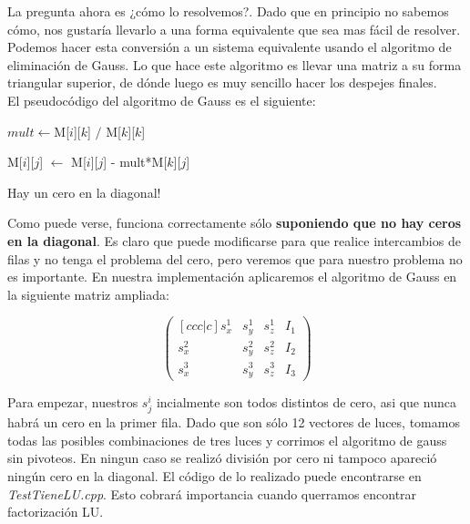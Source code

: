 La pregunta ahora es ¿cómo lo resolvemos?. Dado que en principio no sabemos cómo, nos gustaría llevarlo a una forma equivalente que sea mas fácil de resolver. Podemos hacer esta conversión a un sistema equivalente usando el algoritmo de eliminación de Gauss. Lo que hace este algoritmo es llevar una matriz a su forma triangular superior, de dónde luego es muy sencillo hacer los despejes finales. \\

El pseudocódigo del algoritmo de Gauss es el siguiente:

\begin{algorithm}[H]
\begin{algorithmic}


                \State $mult \gets $M[$i$][$k$] $/$ M[$k$][$k$]

                    \State M[$i$][$j$] $\gets$ M[$i$][$j$] - mult*M[$k$][$j$]

                \EndFor
            \Else
                \State Hay un cero en la diagonal!
            \EndIf
        \EndFor
    \EndFor

\EndFunction
\end{algorithmic}
\end{algorithm}

Como puede verse, funciona correctamente sólo \textbf{suponiendo que no hay ceros en la diagonal}. Es claro que puede modificarse para que realice intercambios de filas y no tenga el problema del cero, pero veremos que para nuestro problema no es importante. En nuestra implementación aplicaremos el algoritmo de Gauss en la siguiente matriz ampliada:

\[
\begin{pmatrix}[ccc|c]
    s_{x}^{1} & s_{y}^{1} & s_{z}^{1} & I_{1} \\
    s_{x}^{2} & s_{y}^{2} & s_{z}^{2} & I_{2} \\
    s_{x}^{3} & s_{y}^{3} & s_{z}^{3} & I_{3}
\end{pmatrix}
\]

Para empezar, nuestros $s_{j}^{i}$ incialmente son todos distintos de cero, asi que nunca habrá un cero en la primer fila. Dado que son sólo 12 vectores de luces, tomamos todas las posibles combinaciones de tres luces y corrimos el algoritmo de gauss sin pivoteos. En ningun caso se realizó división por cero ni tampoco apareció ningún cero en la diagonal. El código de lo realizado puede encontrarse en \textit{TestTieneLU.cpp}. Esto cobrará importancia cuando querramos encontrar factorización LU. \\

